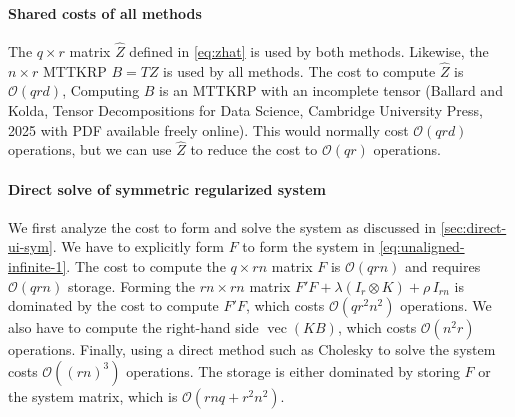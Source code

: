 \documentclass{article}
\DeclareMathOperator{\vecop}{vec}
\theoremstyle{plain} %
\begin{document}
\paragraph{Shared costs of all methods}

The $q \times r$ matrix $\hat{Z}$ defined in \cref{eq:zhat} is used by both methods.
Likewise, the $n \times r$ MTTKRP $B = T Z$ is used by all methods.
The cost to compute $\hat{Z}$ is $\mathcal{O}(qrd)$, 
Computing $B$ is an MTTKRP with an incomplete tensor (Ballard and Kolda, Tensor Decompositions for Data Science, Cambridge University Press, 2025 with PDF available freely online). This would normally cost $\mathcal{O}(qrd)$ operations, but we can use $\hat{Z}$ to
reduce the cost to $\mathcal{O}(qr)$ operations.


\paragraph{Direct solve of symmetric regularized system}

We first analyze the cost to form and solve the system as discussed in \cref{sec:direct-ui-sym}.
We have to explicitly form $F$ to form the system in \cref{eq:unaligned-infinite-1}.
The cost to compute the $q \times rn$ matrix 
$F$ is $\mathcal{O}(qrn)$ and requires $\mathcal{O}(qrn)$ storage.
Forming the $rn \times rn$ matrix $F' F + \lambda (I_r \otimes K) + \rho \, I_{rn}$ is dominated by the cost to compute $F' F$, which costs $\mathcal{O}(q r^2 n^2)$ operations.
We also have to compute the right-hand side $\vecop(K B)$, which costs $\mathcal{O}(n^2 r)$ operations.
Finally,  using a direct method such as Cholesky
to solve the system costs $\mathcal{O}((rn)^3)$ operations.
The storage is either dominated by storing $F$ or the system matrix,
which is $\mathcal{O}(rnq + r^2 n^2)$.
\end{document}
